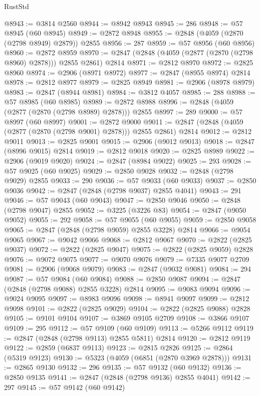 \begin{lexlean}{RustStd}
\begin{coremodule}
@8943 := @3814 @2560
@8944 := @8942 @8943
@8945 := 286
@8948 := @57 @8945 (@60 @8945)
@8949 := @2872 @8948
@8955 := @2848 (@4059 (@2870 (@2798 @8949) @2879)) @2855
@8956 := 287
@8959 := @57 @8956 (@60 @8956)
@8960 := @2872 @8959
@8970 := @2847 (@2848 (@4059 (@2877 (@2870 (@2798 @8960) @2878))) @2855 @2861) @2814
@8971 := @2812 @8970
@8972 := @2825 @8960
@8974 := @2906 (@8971 @8972)
@8977 := @2847 (@8955 @8974) @2814
@8978 := @2812 @8977
@8979 := @2825 @8949
@8981 := @2906 (@8978 @8979)
@8983 := @2847 (@8944 @8981)
@8984 := @3812 @4057
@8985 := 288
@8988 := @57 @8985 (@60 @8985)
@8989 := @2872 @8988
@8996 := @2848 (@4059 (@2877 (@2870 (@2798 @8989) @2878))) @2855
@8997 := 289
@9000 := @57 @8997 (@60 @8997)
@9001 := @2872 @9000
@9011 := @2847 (@2848 (@4059 (@2877 (@2870 (@2798 @9001) @2878))) @2855 @2861) @2814
@9012 := @2812 @9011
@9013 := @2825 @9001
@9015 := @2906 (@9012 @9013)
@9018 := @2847 (@8996 @9015) @2814
@9019 := @2812 @9018
@9020 := @2825 @8989
@9022 := @2906 (@9019 @9020)
@9024 := @2847 (@8984 @9022)
@9025 := 293
@9028 := @57 @9025 (@60 @9025)
@9029 := @2850 @9028
@9032 := @2848 (@2798 @9029) @2855
@9033 := 290
@9036 := @57 @9033 (@60 @9033)
@9037 := @2850 @9036
@9042 := @2847 (@2848 (@2798 @9037) @2855 @4041)
@9043 := 291
@9046 := @57 @9043 (@60 @9043)
@9047 := @2850 @9046
@9050 := @2848 (@2798 @9047) @2855
@9052 := @3225 (@3226 @83)
@9054 := @2847 (@9050 @9052)
@9055 := 292
@9058 := @57 @9055 (@60 @9055)
@9059 := @2850 @9058
@9065 := @2847 (@2848 (@2798 @9059) @2855 @3228) @2814
@9066 := @9054 @9065
@9067 := @9042 @9066
@9068 := @2812 @9067
@9070 := @2822 (@2825 @9037)
@9072 := @2822 (@2825 @9047)
@9075 := @2822 (@2825 @9059) @2828
@9076 := @9072 @9075
@9077 := @9070 @9076
@9079 := @7335 @9077 @2709
@9081 := @2906 (@9068 @9079)
@9083 := @2847 (@9032 @9081)
@9084 := 294
@9087 := @57 @9084 (@60 @9084)
@9088 := @2850 @9087
@9094 := @2847 (@2848 (@2798 @9088) @2855 @3228) @2814
@9095 := @9083 @9094
@9096 := @9024 @9095
@9097 := @8983 @9096
@9098 := @8941 @9097
@9099 := @2812 @9098
@9101 := @2822 (@2825 @9029)
@9104 := @2822 (@2825 @9088) @2828
@9105 := @9101 @9104
@9107 := @3869 @9105 @2709
@9108 := @3866 @9107
@9109 := 295
@9112 := @57 @9109 (@60 @9109)
@9113 := @5266 @9112
@9119 := @2847 (@2848 (@2798 @9113) @2855 @5811) @2814
@9120 := @2812 @9119
@9122 := @2859 (@6837 @9113)
@9123 := @2815 @2826
@9125 := @2864 (@5319 @9123)
@9130 := @5323 (@4059 (@6851 (@2870 @3969 @2878)))
@9131 := @2865 @9130
@9132 := 296
@9135 := @57 @9132 (@60 @9132)
@9136 := @2850 @9135
@9141 := @2847 (@2848 (@2798 @9136) @2855 @4041)
@9142 := 297
@9145 := @57 @9142 (@60 @9142)

\end{coremodule}
\end{lexlean}

